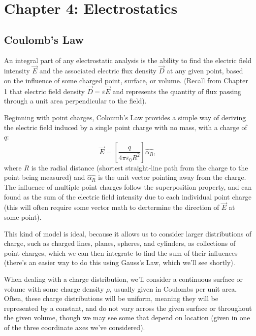 \documentclass{article}
\begin{document}
\setcounter{section}{3}
\section{Chapter 4: Electrostatics}
\setcounter{subsection}{2}
\subsection{Coulomb's Law}
An integral part of any electrostatic analysis is the ability to find the electric field intensity \(\vec{E}\) and the associated electric flux density \(\vec{D}\) at any given point, based on the influence of some charged point, surface, or volume. (Recall from Chapter 1 that electric field density \(\vec{D} = \varepsilon \vec{E}\) and represents the quantity of flux passing through a unit area perpendicular to the field).

Beginning with point charges, Coloumb's Law provides a simple way of deriving the electric field induced by a single point charge with no mass, with a charge of \(q\): \[
	\vec{E} = [\frac{q}{4\pi\varepsilon_0R^2}]\hat{\alpha_R},
\]
where \(R\) is the radial distance (shortest straight-line path from the charge to the point being measured) and \(\hat{\alpha_R}\) is the unit vector pointing away from the charge. The influence of multiple point charges follow the superposition property, and can found as the sum of the electric field intensity due to each individual point charge (this will often require some vector math to dertermine the direction of \(\vec{E}\) at some point).

This kind of model is ideal, because it allows us to consider larger distributions of charge, such as charged lines, planes, spheres, and cylinders, as collections of point charges, which we can then integrate to find the sum of their influences (there's an easier way to do this using Gauss's Law, which we'll see shortly).

When dealing with a charge distribution, we'll consider a continuous surface or volume with some charge density \(\rho\), usually given in Coulombs per unit area. Often, these charge distributions will be uniform, meaning they will be represented by a constant, and do not vary across the given surface or throughout the given volume, though we may see some that depend on location (given in one of the three coordinate axes we've considered).
\end{document}
